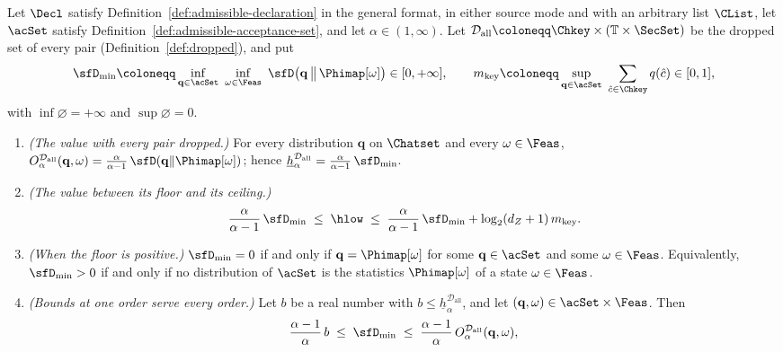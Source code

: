 \begin{proposition}\label{prop:minimal-divergence}
Let $\Decl$ satisfy Definition~\ref{def:admissible-declaration} in the
general format, in either source mode and with an arbitrary list $\CList$,
let $\acSet$ satisfy Definition~\ref{def:admissible-acceptance-set}, and let
$\alpha\in(1,\infty)$. Let
$\mathcal{D}_{\mathrm{all}}\coloneqq\Chkey\times(\mathbb{T}\times\SecSet)$
be the dropped set of every pair (Definition~\ref{def:dropped}), and put
\begin{equation}\label{eq:dmin}
  \sfD_{\min}\coloneqq\inf_{\mathbf q\in\acSet}\ \inf_{\omega\in\Feas}\
  \sfD\big(\mathbf q\,\big\|\,\Phimap[\omega]\big)\in[0,+\infty],
  \qquad
  m_{\mathrm{key}}\coloneqq\sup_{\mathbf q\in\acSet}\
  \sum_{\hat c\in\Chkey}q(\hat c)\in[0,1],
\end{equation}
with $\inf\varnothing=+\infty$ and $\sup\varnothing=0$.
\begin{enumerate}[label=(\roman*),leftmargin=2.2em]
\item \emph{(The value with every pair dropped.)} For every distribution
  $\mathbf q$ on $\Chatset$ and every $\omega\in\Feas$,
  $O^{\mathcal{D}_{\mathrm{all}}}_{\alpha}(\mathbf q,\omega)
  =\frac{\alpha}{\alpha-1}\,\sfD(\mathbf q\|\Phimap[\omega])$; hence
  $\underline{h}^{\mathcal{D}_{\mathrm{all}}}_{\alpha}
  =\frac{\alpha}{\alpha-1}\,\sfD_{\min}$.
\item \emph{(The value between its floor and its ceiling.)}
  \begin{equation}\label{eq:dmin-sandwich}
    \frac{\alpha}{\alpha-1}\,\sfD_{\min}\;\le\;\hlow\;\le\;
    \frac{\alpha}{\alpha-1}\,\sfD_{\min}+\log_2(d_Z+1)\,m_{\mathrm{key}} .
  \end{equation}
\item \emph{(When the floor is positive.)} $\sfD_{\min}=0$ if and only if
  $\mathbf q=\Phimap[\omega]$ for some $\mathbf q\in\acSet$ and some
  $\omega\in\Feas$. Equivalently, $\sfD_{\min}>0$ if and only if no
  distribution of $\acSet$ is the statistics $\Phimap[\omega]$ of a state
  $\omega\in\Feas$.
\item \emph{(Bounds at one order serve every order.)} Let $b$ be a real
  number with $b\le\underline{h}^{\mathcal{D}_{\mathrm{all}}}_{\alpha}$, and
  let $(\mathbf q,\omega)\in\acSet\times\Feas$. Then
  \begin{equation}\label{eq:dmin-bracket}
    \frac{\alpha-1}{\alpha}\,b\;\le\;\sfD_{\min}\;\le\;
    \frac{\alpha-1}{\alpha}\,
    O^{\mathcal{D}_{\mathrm{all}}}_{\alpha}(\mathbf q,\omega),
  \end{equation}

\end{enumerate}
\end{proposition}
